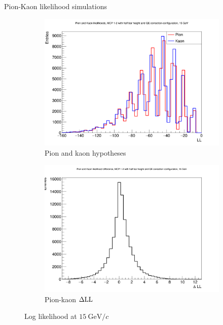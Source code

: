 \documentclass{beamer}
\begin{document}
\begin{frame}{Pion-Kaon likelihood simulations}
  \begin{figure}
    \centering
    \vspace{-0.2cm}
    \begin{subfigure}{0.5\textwidth}
      \includegraphics[width = 1.0\textwidth]{Plots/PionKaonLL15GeVStandardMCPAB.png}
      \caption{Pion and kaon hypotheses}
    \end{subfigure}%
    \begin{subfigure}{0.5\textwidth}
      \includegraphics[width = 1.0\textwidth]{Plots/PionKaonDLL15GeVStandardMCPAB.png}
      \caption{Pion-kaon $\Delta{\rm LL}$}
    \end{subfigure}
    \caption{Log likelihood at $\SI{15}{\giga\eV/c}$}
  \end{figure}
\end{frame}
\end{document}
